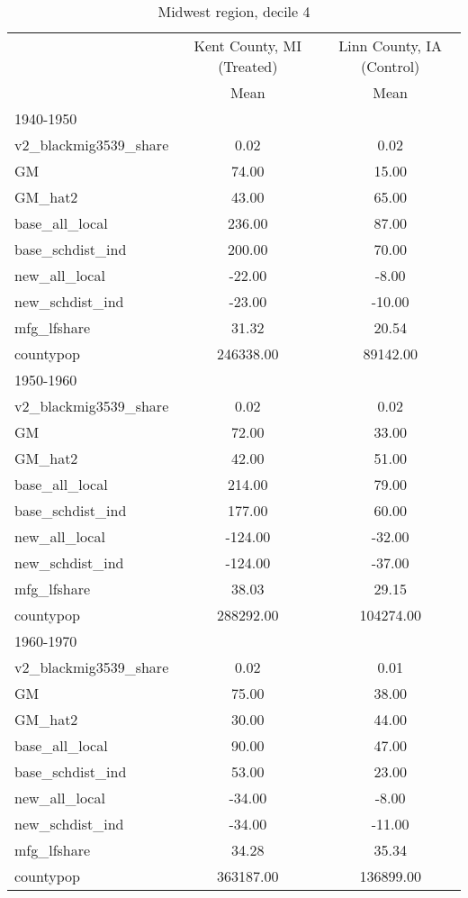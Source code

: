 \begin{table}[htbp]\centering
\def\sym#1{\ifmmode^{#1}\else\(^{#1}\)\fi}
\caption{Midwest region, decile 4 \label{tab1}}
\begin{tabular}{l*{2}{c}}
\toprule
                    &\multicolumn{1}{c}{Kent County, MI (Treated)}&\multicolumn{1}{c}{Linn County, IA (Control)}\\
                    &        Mean&        Mean\\
\midrule
1940-1950           &            &            \\
v2\_blackmig3539\_share&        0.02&        0.02\\
GM                  &       74.00&       15.00\\
GM\_hat2             &       43.00&       65.00\\
base\_all\_local      &      236.00&       87.00\\
base\_schdist\_ind    &      200.00&       70.00\\
new\_all\_local       &      -22.00&       -8.00\\
new\_schdist\_ind     &      -23.00&      -10.00\\
mfg\_lfshare         &       31.32&       20.54\\
countypop           &   246338.00&    89142.00\\
\midrule
1950-1960           &            &            \\
v2\_blackmig3539\_share&        0.02&        0.02\\
GM                  &       72.00&       33.00\\
GM\_hat2             &       42.00&       51.00\\
base\_all\_local      &      214.00&       79.00\\
base\_schdist\_ind    &      177.00&       60.00\\
new\_all\_local       &     -124.00&      -32.00\\
new\_schdist\_ind     &     -124.00&      -37.00\\
mfg\_lfshare         &       38.03&       29.15\\
countypop           &   288292.00&   104274.00\\
\midrule
1960-1970           &            &            \\
v2\_blackmig3539\_share&        0.02&        0.01\\
GM                  &       75.00&       38.00\\
GM\_hat2             &       30.00&       44.00\\
base\_all\_local      &       90.00&       47.00\\
base\_schdist\_ind    &       53.00&       23.00\\
new\_all\_local       &      -34.00&       -8.00\\
new\_schdist\_ind     &      -34.00&      -11.00\\
mfg\_lfshare         &       34.28&       35.34\\
countypop           &   363187.00&   136899.00\\
\bottomrule
\end{tabular}
\end{table}
